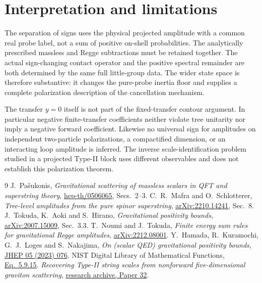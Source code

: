 \documentclass[11pt]{article}
\begin{document}
\section{Interpretation and limitations}
The separation of signs uses the physical projected amplitude with
a common real probe label, not a sum of positive on-shell probabilities.
The analytically prescribed massless and Regge subtractions must be
retained together. The actual sign-changing contact operator and the
positive spectral remainder are both determined by the same full
little-group data. The wider state space is therefore substantive:
it changes the pure-probe inertia floor and supplies a complete
polarization description of the cancellation mechanism.

The transfer $y=0$ itself is not part of the fixed-transfer contour
argument. In particular negative finite-transfer coefficients neither
violate tree unitarity nor imply a negative forward coefficient.
Likewise no universal sign for amplitudes on independent two-particle
polarizations, a compactified dimension, or an interacting loop
amplitude is inferred. The inverse scale-identification problem
studied in a projected Type-II block \cite{scale} uses different
observables and does not establish this polarization theorem.

\begin{thebibliography}{9}
 J.~Pa\v{s}ukonis, \emph{Gravitational scattering of massless scalars in QFT and superstring theory}, \href{https://arxiv.org/abs/hep-th/0506065}{hep-th/0506065},
Secs.~2--3.
 C.~R.~Mafra and O.~Schlotterer,
\emph{Tree-level amplitudes from the pure spinor superstring},
\href{https://arxiv.org/abs/2210.14241}{arXiv:2210.14241}, Sec.~8.
 J.~Tokuda, K.~Aoki and S.~Hirano,
\emph{Gravitational positivity bounds},
\href{https://arxiv.org/abs/2007.15009}{arXiv:2007.15009}, Sec.~3.3.
 T.~Noumi and J.~Tokuda,
\emph{Finite energy sum rules for gravitational Regge amplitudes},
\href{https://arxiv.org/abs/2212.08001}{arXiv:2212.08001}.
 Y.~Hamada, R.~Kuramochi, G.~J.~Loges and S.~Nakajima,
\emph{On (scalar QED) gravitational positivity bounds},
\href{https://doi.org/10.1007/JHEP05(2023)076}{JHEP 05 (2023) 076}.
 NIST Digital Library of Mathematical Functions,
\href{https://dlmf.nist.gov/5.9.E15}{Eq.~5.9.15}.
 \emph{Recovering Type-II string scales from nonforward
five-dimensional graviton scattering},
\href{https://github.com/g3173028019-beep/ai-automated-quantum-gravity-research/tree/main/papers/32-typeii-scale-recovery}{research archive, Paper 32}.
\end{thebibliography}
\end{document}
